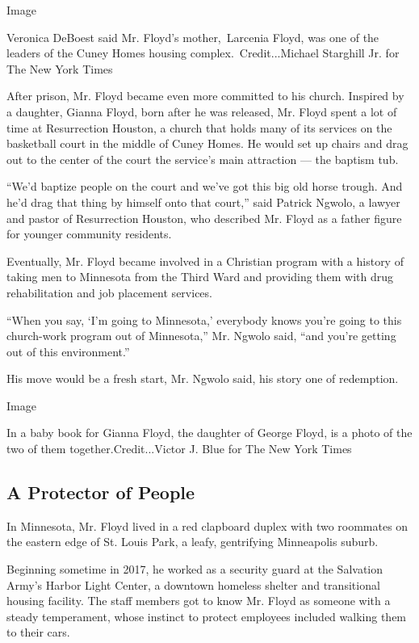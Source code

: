 Image

Veronica DeBoest said Mr. Floyd's mother,~Larcenia Floyd, was one of the
leaders of the Cuney Homes housing complex.~Credit...Michael Starghill
Jr. for The New York Times

After prison, Mr. Floyd became even more committed to his church.
Inspired by a daughter, Gianna Floyd, born after he was released, Mr.
Floyd spent a lot of time at Resurrection Houston, a church that holds
many of its services on the basketball court in the middle of Cuney
Homes. He would set up chairs and drag out to the center of the court
the service's main attraction --- the baptism tub.

``We'd baptize people on the court and we've got this big old horse
trough. And he'd drag that thing by himself onto that court,'' said
Patrick Ngwolo, a lawyer and pastor of Resurrection Houston, who
described Mr. Floyd as a father figure for younger community residents.

Eventually, Mr. Floyd became involved in a Christian program with a
history of taking men to Minnesota from the Third Ward and providing
them with drug rehabilitation and job placement services.

``When you say, `I'm going to Minnesota,' everybody knows you're going
to this church-work program out of Minnesota,'' Mr. Ngwolo said, ``and
you're getting out of this environment.''

His move would be a fresh start, Mr. Ngwolo said, his story one of
redemption.

Image

In a baby book for Gianna Floyd, the daughter of George Floyd, is a
photo of the two of them together.Credit...Victor J. Blue for The New
York Times

\hypertarget{a-protector-of-people}{%
\subsection{A Protector of People}\label{a-protector-of-people}}

In Minnesota, Mr. Floyd lived in a red clapboard duplex with two
roommates on the eastern edge of St. Louis Park, a leafy, gentrifying
Minneapolis suburb.

Beginning sometime in 2017, he worked as a security guard at the
Salvation Army's Harbor Light Center, a downtown homeless shelter and
transitional housing facility. The staff members got to know Mr. Floyd
as someone with a steady temperament, whose instinct to protect
employees included walking them to their cars.

